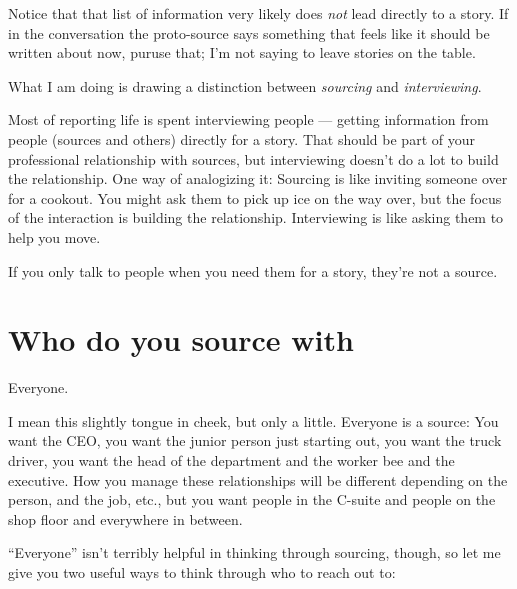 \documentclass[
  12pt,
  american,
  letterpaperpaper,
  extrafontsizes,onecolumn,openright
  ]{memoir}
\begin{document}
Notice that that list of information very likely does \emph{not} lead directly to a story. If in the conversation the proto-source says something that feels like it should be written about now, puruse that; I'm not saying to leave stories on the table.

What I am doing is drawing a distinction between \emph{sourcing} and \emph{interviewing}.

Most of reporting life is spent interviewing people --- getting information from people (sources and others) directly for a story. That should be part of your professional relationship with sources, but interviewing doesn't do a lot to build the relationship. One way of analogizing it: Sourcing is like inviting someone over for a cookout. You might ask them to pick up ice on the way over, but the focus of the interaction is building the relationship. Interviewing is like asking them to help you move.

If you only talk to people when you need them for a story, they're not a source.

\hypertarget{who-do-you-source-with}{%
\section*{Who do you source with}\label{who-do-you-source-with}}

Everyone.

I mean this slightly tongue in cheek, but only a little. Everyone is a source: You want the CEO, you want the junior person just starting out, you want the truck driver, you want the head of the department and the worker bee and the executive. How you manage these relationships will be different depending on the person, and the job, etc., but you want people in the C-suite and people on the shop floor and everywhere in between.

\enquote{Everyone} isn't terribly helpful in thinking through sourcing, though, so let me give you two useful ways to think through who to reach out to:
\end{document}
